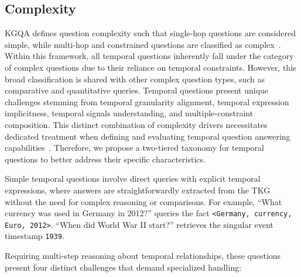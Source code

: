 \subsection{Complexity\label{complexity}}
KGQA defines question complexity such that single-hop questions are considered simple, while multi-hop and constrained questions are classified as complex~\cite{baoConstraintBasedQuestionAnswering2016}. Within this framework, all temporal questions inherently fall under the category of complex questions due to their reliance on temporal constraints. However, this broad classification is shared with other complex question types, such as comparative and quantitative queries. Temporal questions present unique challenges stemming from temporal granularity alignment, temporal expression implicitness, temporal signals understanding, and multiple-constraint composition. This distinct combination of complexity drivers necessitates dedicated treatment when defining and evaluating temporal question answering capabilities~\cite{fuSurveyComplexQuestion2020a,lanSurveyComplexKnowledge2021}. Therefore, we propose a two-tiered taxonomy for temporal questions to better address their specific characteristics.

Simple temporal questions involve direct queries with explicit temporal expressions, where answers are straightforwardly extracted from the TKG without the need for complex reasoning or comparisons.
For example, ``What currency was used in Germany in 2012?'' queries the fact \texttt{<Germany, currency, Euro, 2012>}. ``When did World War II start?'' retrieves the singular event timestamp \texttt{1939}.

Requiring multi-step reasoning about temporal relationships, these questions present four distinct challenges that demand specialized handling:

